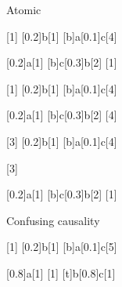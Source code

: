 \documentclass[tikz]{standalone}
\begin{document}

  \begin{msc}{Atomic}

     \nextlevel[2]

     [1]
     [0.2]{b}[1]
     [b]{a}[0.1]{c}[4]

     \nextlevel[1]

     [0.2]{a}[1]
     [b]{c}[0.3]{b}[2]
     [1]

     \nextlevel[4]
     \nextlevel[2]

     [1]
     [0.2]{b}[1]
     [b]{a}[0.1]{c}[4]

     \nextlevel[1]

     [0.2]{a}[1]
     [b]{c}[0.3]{b}[2]
     [4]


     \nextlevel[5]
     \nextlevel[2]

     [3]
     [0.2]{b}[1]
     [b]{a}[0.1]{c}[4]

     \nextlevel[1]
     [3]

     [0.2]{a}[1]
     [b]{c}[0.3]{b}[2]
     [1]
     

     


  \end{msc}


  \begin{msc}{Confusing causality}

     [1]
     [0.2]{b}[1]
     [b]{a}[0.1]{c}[5]

     \nextlevel[3]


     [0.8]{a}[1]
     [1]
     [t]{b}[0.8]{c}[1]


  \end{msc}
\end{document}
